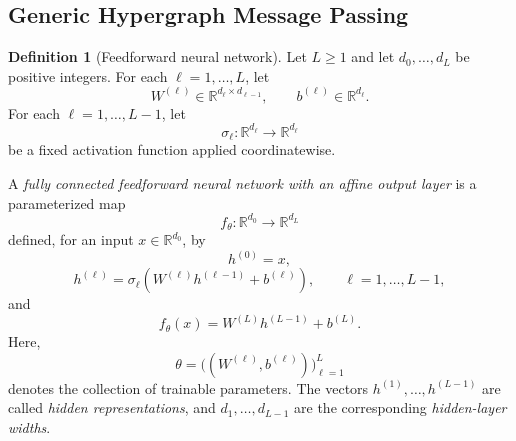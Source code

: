 \documentclass{article}
\theoremstyle{definition}
\newtheorem{definition}{Definition}
\theoremstyle{plain}
\begin{document}
\subsection{Generic Hypergraph Message Passing}
\begin{definition}[Feedforward neural network]

\label{def:feedforward-neural-network}
Let $L \geq 1$ and let $d_0,\ldots,d_L$ be positive integers.
For each $\ell=1,\ldots,L$, let
\[
  W^{(\ell)} \in \mathbb{R}^{d_\ell \times d_{\ell-1}},
  \qquad
  b^{(\ell)} \in \mathbb{R}^{d_\ell}.
\]
For each $\ell=1,\ldots,L-1$, let
\[
  \sigma_\ell :
  \mathbb{R}^{d_\ell} \longrightarrow \mathbb{R}^{d_\ell}
\]
be a fixed activation function applied coordinatewise.

A \emph{fully connected feedforward neural network with an
affine output layer} is a parameterized map
\[
  f_\theta :
  \mathbb{R}^{d_0} \longrightarrow \mathbb{R}^{d_L}
\]
defined, for an input $x \in \mathbb{R}^{d_0}$, by
\[
  h^{(0)} = x,
\]
\[
  h^{(\ell)}
  =
  \sigma_\ell\!\left(
    W^{(\ell)}h^{(\ell-1)} + b^{(\ell)}
  \right),
  \qquad \ell=1,\ldots,L-1,
\]
and
\[
  f_\theta(x)
  =
  W^{(L)}h^{(L-1)} + b^{(L)}.
\]
Here,
\[
  \theta
  =
  \bigl((W^{(\ell)},b^{(\ell)})\bigr)_{\ell=1}^{L}
\]
denotes the collection of trainable parameters.
The vectors $h^{(1)},\ldots,h^{(L-1)}$ are called
\emph{hidden representations}, and
$d_1,\ldots,d_{L-1}$ are the corresponding
\emph{hidden-layer widths}.

\end{definition}
\end{document}
